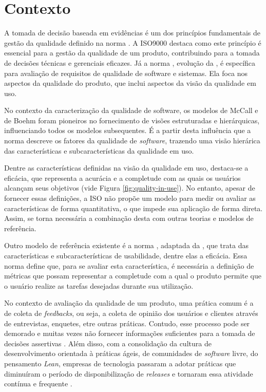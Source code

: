 \section{Contexto}\label{contextualizacao}



A tomada de decisão baseada em evidências é um dos princípios fundamentais de gestão da qualidade definido na norma . A ISO9000 destaca como este princípio é essencial para a gestão da qualidade de um produto, contribuindo para a tomada de decisões técnicas e gerenciais eficazes. Já a norma , evolução da , é específica para avaliação de requisitos de qualidade de software e sistemas. Ela foca nos aspectos da qualidade do produto, que inclui aspectos da visão da qualidade em uso. 

No contexto da caracterização da qualidade de software, os modelos de McCall \cite{mccall1977factors} e de Boehm \cite{boehm1978characteristics} foram pioneiros no fornecimento de visões estruturadas e hierárquicas, influenciando todos os modelos subsequentes. É a partir desta influência que a norma  descreve os fatores da qualidade de \textit{software}, trazendo uma visão hierárica das características e subcaracterísticas da qualidade em uso.

Dentre as características definidas na visão da  qualidade em uso, destaca-se a eficácia, que representa a acurácia e a completude com as quais os usuários alcançam seus objetivos (vide Figura \ref{fig:quality-in-use}). No entanto, apesar de fornecer essas definições, a ISO não propõe um modelo para medir ou avaliar as características de forma quantitativa, o que impede sua aplicação de forma direta. Assim, se torna necessária a combinação desta com outras teorias e modelos de referência.

Outro modelo de referência existente é a norma , adaptada da , que trata das características e subcaracterísticas de usabilidade, dentre elas a eficácia. Essa norma define que, para se avaliar esta característica, é necessária a definição de métricas que possam representar a completude com a qual o produto permite que o usuário realize as tarefas desejadas durante sua utilização.

No contexto de avaliação da qualidade de um produto, uma prática comum é a de coleta de \textit{feedbacks}, ou seja, a coleta de opinião dos usuários e clientes através de entrevistas, enquetes, etre outras práticas. Contudo, esse processo pode ser demorado e muitas vezes não fornecer informações suficientes para a tomada de decisões assertivas \cite{olsson_opinions_2014}. Além disso, com a consolidação da cultura de desenvolvimento orientada à práticas ágeis, de comunidades de \textit{software} livre, do pensamento \textit{Lean}, empresas de tecnologia passaram a adotar práticas que diminuíram o período de disponibilização de \textit{releases} e tornaram essa atividade contínua e frequente \cite{kevic_characterizing_2017}.

